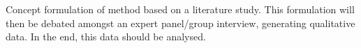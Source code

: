 Concept formulation of method based on a literature study.
This formulation will then be debated amongst an expert panel/group interview, generating qualitative data.
In the end, this data should be analysed.


